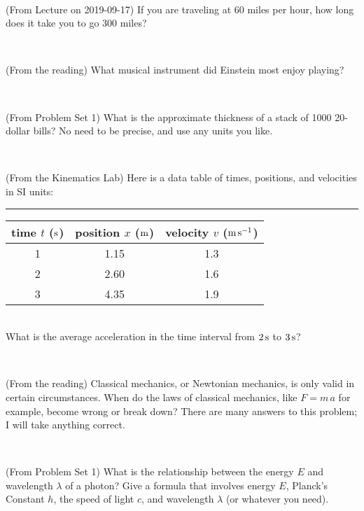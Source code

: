 \documentclass[12pt, letterpaper]{article}
\begin{document}
\vfill ~

\begin{problem} (From Lecture on 2019-09-17)
If you are traveling at 60 miles per hour, how long does
it take you to go 300 miles?
\end{problem}


\vfill ~

\begin{problem} (From the reading)
What musical instrument did Einstein most enjoy playing?
\end{problem}


\vfill ~


\clearpage


\begin{problem} (From Problem Set 1)
What is the approximate thickness of a stack of 1000 20-dollar bills?
No need to be precise, and use any units you like.
\end{problem}


\vfill ~

\begin{problem} (From the Kinematics Lab)
Here is a data table of times, positions, and velocities in SI units:\\
\rule{1.0in}{0pt}\begin{tabular}{c|c|c}
time $t$ ($\mathrm{s}$) & position $x$ ($\mathrm{m}$) & velocity $v$ ($\mathrm{m}\,\mathrm{s}^{-1}$) \\
\hline
1 & 1.15 & 1.3 \\
2 & 2.60 & 1.6 \\
3 & 4.35 & 1.9 \\
\hline
\end{tabular}\\
What is the average acceleration in the time interval from $2\,\mathrm{s}$ to $3\,\mathrm{s}$?
\end{problem}


\vfill ~

\begin{problem} (From the reading)
Classical mechanics, or Newtonian mechanics, is only valid in certain
circumstances. When do the laws of classical mechanics, like $F =
m\,a$ for example, become wrong or break down? There are many answers
to this problem; I will take anything correct.
\end{problem}


\vfill ~

\begin{problem} (From Problem Set 1)
What is the relationship between the energy $E$ and wavelength
$\lambda$ of a photon? Give a formula that involves energy $E$,
Planck's Constant $h$, the speed of light $c$, and wavelength
$\lambda$ (or whatever you need).
\end{problem}
\end{document}

